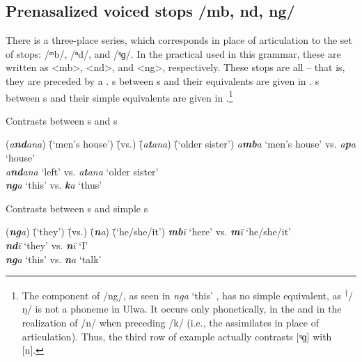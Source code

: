 \subsection{Prenasalized voiced stops /mb, nd, ng/}\label{sec:2.1.2}


There is a three-place    series, which corresponds in place of articulation to the set of  stops:  /ᵐb/,  /ⁿd/, and  /ᵑɡ/. In the practical  used in this grammar, these are written as <mb>, <nd>, and <ng>, respectively. These stops are all  -- that is, they are preceded by a  . s between   s and their  equivalents are given in . s between   s and their simple  equivalents are given in .\footnote{The   component of /ng/, as seen in \textit{nga} ‘this’ , has no simple  equivalent, as \textsuperscript{†}/ŋ/ is not a phoneme in Ulwa. It occurs only phonetically, in the     and in the realization of /n/ when preceding /k/ (i.e., the   assimilates in place of articulation). Thus, the third row of example  actually contrasts [ᵑɡ] with [n].}


\ea%
    \label{ex:phon:7}
            Contrasts between   s and  s\\
\begin{tabbing}
{(\textit{a\textbf{nd}ana})} \= {(‘men’s house’)} \= {(vs.)} \= {(\textit{a\textbf{t}ana})} \= {(‘older sister’)}\kill
{\textit{a\textbf{mb}a}} \> {‘men’s house’} \> {vs.} \> {\textit{a\textbf{p}a}} \> {‘house’}\\
{\textit{a\textbf{nd}ana}} \> {‘left’} \> {vs.} \> {\textit{a\textbf{t}ana}} \> {‘older sister’}\\
{\textit{\textbf{ng}a}} \> {‘this’} \> {vs.} \> {\textit{\textbf{k}a}} \> {‘thus’}
\end{tabbing}
\z

\ea%
    \label{ex:phon:8}
            Contrasts between   s and simple s\\
\begin{tabbing}
{(\textit{\textbf{ng}a})} \= {(‘they’)} \= {(vs.)} \= {(\textit{\textbf{n}a})} \= {(‘he/she/it’)}\kill
{\textit{\textbf{mb}ï}} \> {‘here’} \> {vs.} \> {\textit{\textbf{m}ï}} \> {‘he/she/it’}\\
{\textit{\textbf{nd}ï}} \> {‘they’} \> {vs.} \> {\textit{\textbf{n}ï}} \> {‘I’}\\
{\textit{\textbf{ng}a}} \> {‘this’} \> {vs.} \> {\textit{\textbf{n}a}} \> {‘talk’}
\end{tabbing}
\z

